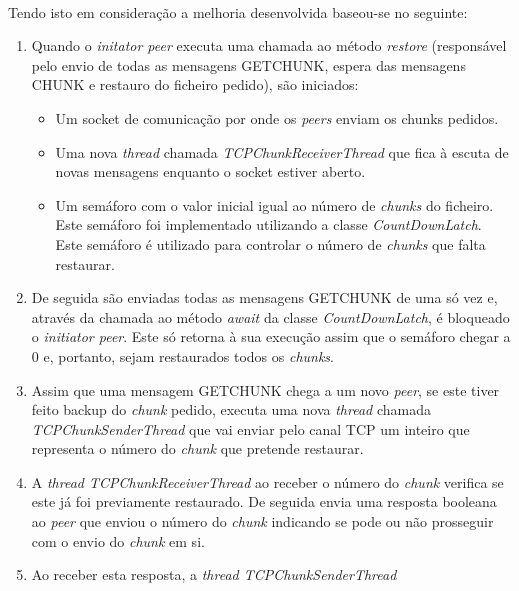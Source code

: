 \documentclass[11pt,oneside]{book}
\begin{document}
\paragraph{}
    Tendo isto em consideração a melhoria desenvolvida baseou-se no seguinte:
    \begin{enumerate}
        \item Quando o \textit{initator peer} executa uma chamada ao método
        \textit{restore} (responsável pelo envio de todas as mensagens GETCHUNK,
        espera das mensagens CHUNK e restauro do ficheiro pedido), são iniciados:
        \begin{itemize}
            \item Um socket de comunicação por onde os \textit{peers} enviam os
            chunks pedidos.
            \item Uma nova \textit{thread} chamada \textit{TCPChunkReceiverThread}
            que fica à escuta de novas mensagens enquanto o socket estiver
            aberto.
            \item Um semáforo com o valor inicial igual ao número de \textit{chunks}
            do ficheiro. Este semáforo foi implementado utilizando a classe
            \textit{CountDownLatch}. Este semáforo é utilizado para controlar
            o número de \textit{chunks} que falta restaurar.
        \end{itemize}
        \item De seguida são enviadas todas as mensagens GETCHUNK de uma só vez e,
        através da chamada ao método \textit{await} da classe \textit{CountDownLatch},
        é bloqueado o \textit{initiator peer}. Este só retorna à sua execução assim
        que o semáforo chegar a 0 e, portanto, sejam restaurados todos os 
        \textit{chunks}.
        \item Assim que uma mensagem GETCHUNK chega a um novo \textit{peer}, se
        este tiver feito backup do \textit{chunk} pedido, executa uma nova
        \textit{thread} chamada \textit{TCPChunkSenderThread} que vai enviar pelo 
        canal TCP um inteiro que representa o número do \textit{chunk} que 
        pretende restaurar. 
        \item A \textit{thread TCPChunkReceiverThread} ao receber o número do 
        \textit{chunk} verifica se este já foi previamente restaurado. De seguida
        envia uma resposta booleana ao \textit{peer} que enviou o número do 
        \textit{chunk} indicando se pode ou não prosseguir com o envio do 
        \textit{chunk} em si.
        \item Ao receber esta resposta, a \textit{thread TCPChunkSenderThread} 

\end{enumerate}
\end{document}

